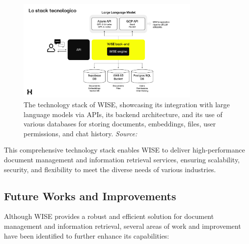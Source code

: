 \begin{figure}[h!]
    \centering
    \includegraphics[width=0.8\textwidth]{images/wise/wise-stack.png}
    \caption{The technology stack of WISE, showcasing its integration with large language models via APIs, its backend architecture, and its use of various databases for storing documents, embeddings, files, user permissions, and chat history. \textit{Source:} \cite{hpa2024}}
    \label{fig:wise-stack}
\end{figure}

This comprehensive technology stack enables WISE to deliver high-performance document management and information retrieval services, ensuring scalability, security, and flexibility to meet the diverse needs of various industries. \cite{hpa2024}

\subsection{Future Works and Improvements}

Although WISE provides a robust and efficient solution for document management and information retrieval, several areas of work and improvement have been identified to further enhance its capabilities:

